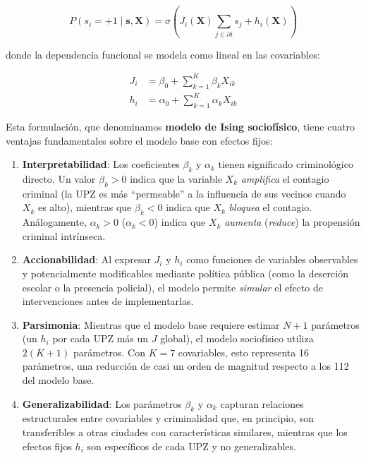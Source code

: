 \documentclass[12pt,a4paper]{article}
\begin{document}
\begin{equation}\label{eq:sociofisico}
P(s_i=+1 \mid \mathbf{s}, \mathbf{X}) = \sigma\!\left(J_i(\mathbf{X}) \sum_{j \in \partial i} s_j + h_i(\mathbf{X})\right)
\end{equation}

donde la dependencia funcional se modela como lineal en las covariables:

\begin{align}
J_i &= \beta_0 + \sum_{k=1}^{K} \beta_k X_{ik} \label{eq:J_modulado} \\
h_i &= \alpha_0 + \sum_{k=1}^{K} \alpha_k X_{ik} \label{eq:h_explicado}
\end{align}

Esta formulación, que denominamos \textbf{modelo de Ising sociofísico}, tiene cuatro ventajas fundamentales sobre el modelo base con efectos fijos:

\begin{enumerate}[label=\alph*)]
    \item \textbf{Interpretabilidad}: Los coeficientes $\beta_k$ y $\alpha_k$ tienen significado criminológico directo. Un valor $\beta_k > 0$ indica que la variable $X_k$ \textit{amplifica} el contagio criminal (la UPZ es más ``permeable'' a la influencia de sus vecinos cuando $X_k$ es alto), mientras que $\beta_k < 0$ indica que $X_k$ \textit{bloquea} el contagio. Análogamente, $\alpha_k > 0$ ($\alpha_k < 0$) indica que $X_k$ \textit{aumenta} (\textit{reduce}) la propensión criminal intrínseca.
    
    \item \textbf{Accionabilidad}: Al expresar $J_i$ y $h_i$ como funciones de variables observables y potencialmente modificables mediante política pública (como la deserción escolar o la presencia policial), el modelo permite \textit{simular} el efecto de intervenciones antes de implementarlas.
    
    \item \textbf{Parsimonia}: Mientras que el modelo base requiere estimar $N + 1$ parámetros (un $h_i$ por cada UPZ más un $J$ global), el modelo sociofísico utiliza $2(K+1)$ parámetros. Con $K = 7$ covariables, esto representa 16 parámetros, una reducción de casi un orden de magnitud respecto a los 112 del modelo base.
    
    \item \textbf{Generalizabilidad}: Los parámetros $\beta_k$ y $\alpha_k$ capturan relaciones estructurales entre covariables y criminalidad que, en principio, son transferibles a otras ciudades con características similares, mientras que los efectos fijos $h_i$ son específicos de cada UPZ y no generalizables.
\end{enumerate}
\end{document}
